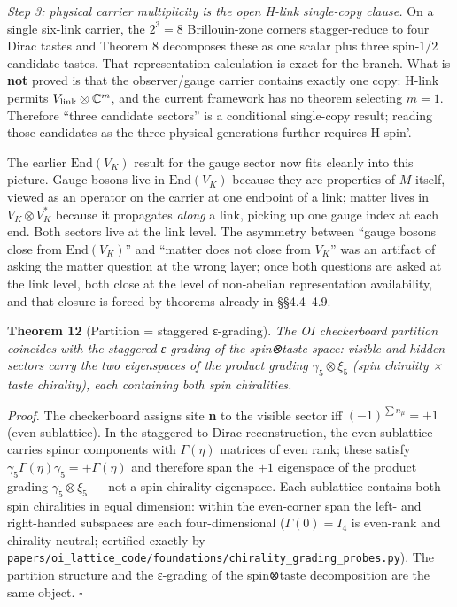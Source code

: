 \documentclass[
]{article}
\begin{document}
\emph{Step 3: physical carrier multiplicity is the open H-link
single-copy clause.} On a single six-link carrier, the \(2^3=8\)
Brillouin-zone corners stagger-reduce to four Dirac tastes and Theorem 8
decomposes these as one scalar plus three spin-\(1/2\) candidate tastes.
That representation calculation is exact for the branch. What is
\textbf{not} proved is that the observer/gauge carrier contains exactly
one copy: H-link permits \(V_{\rm link}\otimes\mathbb C^m\), and the
current framework has no theorem selecting \(m=1\). Therefore ``three
candidate sectors'' is a conditional single-copy result; reading those
candidates as the three physical generations further requires H-spin'.

The earlier \(\mathrm{End}(V_K)\) result for the gauge sector now fits
cleanly into this picture. Gauge bosons live in \(\mathrm{End}(V_K)\)
because they are properties of \(M\) itself, viewed as an operator on
the carrier at one endpoint of a link; matter lives in
\(V_K \otimes V_K^*\) because it propagates \emph{along} a link, picking
up one gauge index at each end. Both sectors live at the link level. The
asymmetry between ``gauge bosons close from \(\mathrm{End}(V_K)\)'' and
``matter does not close from \(V_K\)'' was an artifact of asking the
matter question at the wrong layer; once both questions are asked at the
link level, both close at the level of non-abelian representation
availability, and that closure is forced by theorems already in
§§4.4--4.9.

\textbf{Theorem 12} (Partition = staggered ε-grading). \emph{The OI
checkerboard partition coincides with the staggered ε-grading of the
spin⊗taste space: visible and hidden sectors carry the two eigenspaces
of the product grading \(\gamma_5 \otimes \xi_5\) (spin chirality ×
taste chirality), each containing both spin chiralities.}

\emph{Proof.} The checkerboard assigns site \textbf{n} to the visible
sector iff \((-1)^{\sum n_\mu} = +1\) (even sublattice). In the
staggered-to-Dirac reconstruction, the even sublattice carries spinor
components with \(\Gamma(\eta)\) matrices of even rank; these satisfy
\(\gamma_5 \Gamma(\eta) \gamma_5 = +\Gamma(\eta)\) and therefore span
the \(+1\) eigenspace of the product grading \(\gamma_5 \otimes \xi_5\)
--- not a spin-chirality eigenspace. Each sublattice contains both spin
chiralities in equal dimension: within the even-corner span the left-
and right-handed subspaces are each four-dimensional
(\(\Gamma(0) = I_4\) is even-rank and chirality-neutral; certified
exactly by
\texttt{papers/oi\_lattice\_code/foundations/chirality\_grading\_probes.py}).
The partition structure and the ε-grading of the spin⊗taste
decomposition are the same object. \(\square\)
\end{document}
